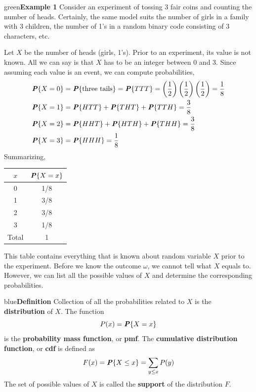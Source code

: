 \documentclass{article}
\newenvironment{example}[1]{\begin{mybox}{green}{\textbf{Example #1}}}{\end{mybox}}
\newenvironment{definition}[1]{\begin{mybox}{blue}{\textbf{Definition #1}}}{\end{mybox}}
\newcommand{\prob}[1]{\textbf{\textit{P}}\{#1\}}
\begin{document}
\begin{example}{1}
Consider an experiment of tossing 3 fair coins and counting the number of heads. Certainly, the same model suits the number of girls in a family with 3 children, the number of 1’s in a random binary code consisting of 3 characters, etc.

Let $X$ be the number of heads (girls, 1’s). Prior to an experiment, its value is not known. All we can say is that $X$ has to be an integer between 0 and 3. Since assuming each value is an event, we can compute probabilities,
\begin{align*}
    \prob{X = 0} &= \textbf{\textit{P}}\{\text{three tails}\} = \textbf{\textit{P}}\{TTT\} = \left(\frac{1}{2}\right) \left(\frac{1}{2}\right) \left(\frac{1}{2}\right) = \frac{1}{8}\\
    \textbf{\textit{P}}\{X = 1\} &= \prob{HTT} + \prob{THT} + \prob{TTH} = \frac{3}{8}\\
    \prob{X = 2} &= \prob{HHT} + \prob{HTH} + \prob{THH} = \frac{3}{8}\\
    \prob{X = 3} &= \prob{HHH} = \frac{1}{8}
\end{align*}
Summarizing,
\begin{center}
\begin{tabular}{c|c}
$x$   & $\prob{X = x}$  \\ 
\hline
0     & 1/8             \\
1     & 3/8             \\
2     & 3/8             \\
3     & 1/8             \\ 
\hline
Total & 1              
\end{tabular}
\end{center}
\end{example}
This table contains everything that is known about random variable $X$ prior to the experiment. Before we know the outcome $\omega$, we cannot tell what $X$ equals to. However, we can list all the possible values of $X$ and determine the corresponding probabilities.

\begin{definition}{}
Collection of all the probabilities related to $X$ is the \textbf{distribution} of $X$. The function
\begin{equation*}
    P(x) = \prob{X = x}
\end{equation*}
is the \textbf{probability mass function}, or \textbf{pmf}. The \textbf{cumulative distribution function}, or \textbf{cdf} is defined as
\begin{equation}
    F(x) = \prob{X \leq x} = \sum_{y \leq x} P(y)
\end{equation}
The set of possible values of $X$ is called the \textbf{support} of the distribution $F$.
\end{definition}
\end{document}
